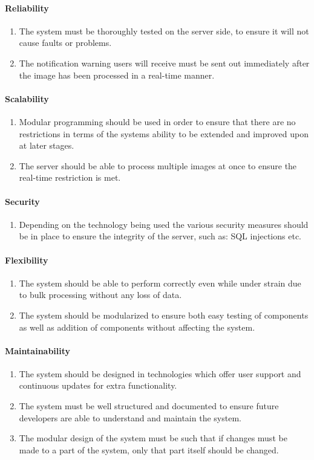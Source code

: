 \documentclass[a4paper,12pt]{report}
\begin{document}
\paragraph{Reliability}
\begin{enumerate}
	\item The system must be thoroughly tested on the server side, to
	ensure it will not cause faults or problems. 
	\item The notification warning users will receive must be sent out immediately after the image has been processed in a real-time manner.
\end{enumerate}
\paragraph{Scalability}
\begin{enumerate}
	\item Modular programming should be used in order to ensure that there are no restrictions in terms of the systems ability to be extended and improved upon at later stages.
	\item The server should be able to process multiple images at once to ensure the real-time restriction is met.
\end{enumerate}
\paragraph{Security}
\begin{enumerate}
	\item Depending on the technology being used the various security measures should be in place to ensure the integrity of the server, such as: SQL injections etc.
\end{enumerate}
\paragraph{Flexibility}
\begin{enumerate}
	\item The system should be able to perform correctly even while under strain due to bulk processing without any loss of data.
	\item The system should be modularized to ensure both easy testing of components as well as addition of components without affecting the system.
\end{enumerate}
\paragraph{Maintainability}
\begin{enumerate}
	\item The system should be designed in technologies which offer user support and continuous updates for extra functionality.
	\item The system must be well structured and documented to ensure future developers are able to understand and maintain the system.
	\item The modular design of the system must be such that if changes must be made to a part of the system, only that part itself should be changed.
\end{enumerate}
\end{document}
